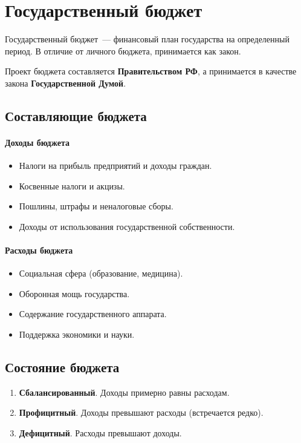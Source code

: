 \documentclass[12pt]{article}
\begin{document}
	\section{Государственный бюджет}
	
	\begin{definition}
		Государственный бюджет~--- финансовый план государства на определенный период. В отличие от личного бюджета, принимается как закон.
	\end{definition}
	
	\noindent Проект бюджета составляется \textbf{Правительством РФ}, а принимается в качестве закона \textbf{Государственной Думой}.
	
	\subsection{Составляющие бюджета}
	
	\paragraph{Доходы бюджета}
	\begin{itemize}
		\item Налоги на прибыль предприятий и доходы граждан.
		\item Косвенные налоги и акцизы.
		\item Пошлины, штрафы и неналоговые сборы.
		\item Доходы от использования государственной собственности.
	\end{itemize}
	
	\paragraph{Расходы бюджета}
	
	\begin{itemize}
		\item Социальная сфера (образование, медицина).
		\item Оборонная мощь государства.
		\item Содержание государственного аппарата.
		\item Поддержка экономики и науки.
	\end{itemize}
	
	\subsection{Состояние бюджета}
	
	\begin{enumerate}
		\item \textbf{Сбалансированный}. Доходы примерно равны расходам.
		\item \textbf{Профицитный}. Доходы превышают расходы (встречается редко).
		\item \textbf{Дефицитный}. Расходы превышают доходы.
	\end{enumerate}
	
\end{document}
